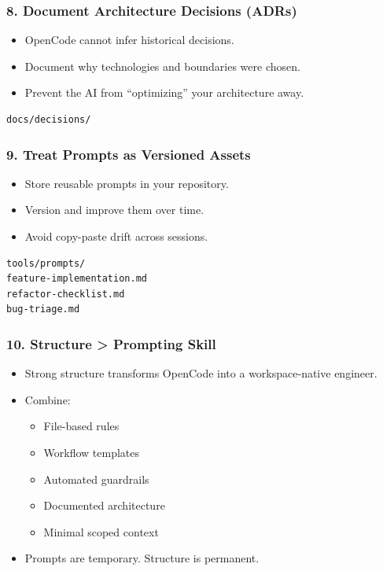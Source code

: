 \begin{frame}[fragile]\frametitle{8. Document Architecture Decisions (ADRs)}
  \begin{itemize}
    \item OpenCode cannot infer historical decisions.
    \item Document why technologies and boundaries were chosen.
    \item Prevent the AI from “optimizing” your architecture away.
  \end{itemize}

\begin{lstlisting}
docs/decisions/
\end{lstlisting}
\end{frame}

\begin{frame}[fragile]\frametitle{9. Treat Prompts as Versioned Assets}
  \begin{itemize}
    \item Store reusable prompts in your repository.
    \item Version and improve them over time.
    \item Avoid copy-paste drift across sessions.
  \end{itemize}

\begin{lstlisting}
tools/prompts/
feature-implementation.md
refactor-checklist.md
bug-triage.md
\end{lstlisting}
\end{frame}

\begin{frame}[fragile]\frametitle{10. Structure > Prompting Skill}
  \begin{itemize}
    \item Strong structure transforms OpenCode into a workspace-native engineer.
    \item Combine:
    \begin{itemize}
        \item File-based rules
        \item Workflow templates
        \item Automated guardrails
        \item Documented architecture
        \item Minimal scoped context
    \end{itemize}
    \item Prompts are temporary. Structure is permanent.
  \end{itemize}
\end{frame}

